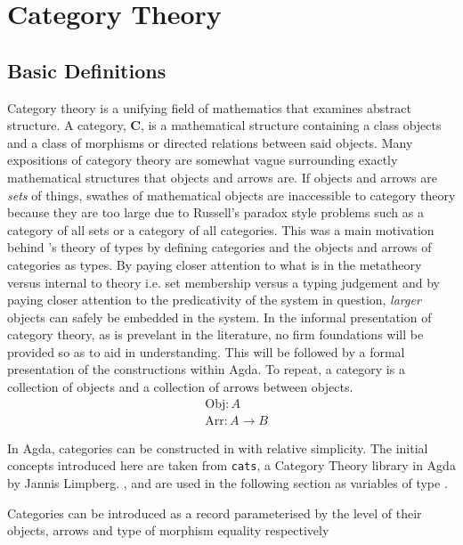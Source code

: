 \section{Category Theory}

\subsection{Basic Definitions}
Category theory is a unifying field of mathematics that examines abstract
structure. A category, \textbf{C}, is a mathematical structure containing a
class objects and a class of morphisms or directed relations between said
objects. Many expositions of category theory are somewhat vague surrounding
exactly mathematical structures that objects and arrows are. If objects and
arrows are \textit{sets} of things, swathes of mathematical objects are
inaccessible to category theory because they are too large due to Russell's
paradox style problems such as a category of all sets or a category of all
categories. This was a main motivation behind \mlt's theory of types by
defining categories and the objects and arrows of categories as types. By paying
closer attention to what is in the metatheory versus internal to theory i.e. set
membership versus a typing judgement and by paying closer attention to the
predicativity of the system in question, \textit{larger} objects can safely be
embedded in the system. In the informal presentation of
category theory, as is prevelant in the literature, no firm foundations will be
provided so as to aid in understanding. This will be followed by a formal
presentation of the constructions within Agda. To repeat, a category is a
collection of objects and a collection of arrows between objects.
\begin{align*}
    &\textrm{Obj} : A \\
    &\textrm{Arr} : A \rightarrow B
\end{align*}

In Agda, categories can be constructed in with relative simplicity. The initial
concepts introduced here are taken from \verb|cats|, a Category Theory library
in Agda by Jannis Limpberg. ,  and 
are used in the following section as variables of type .

Categories can be introduced as a record parameterised by the level of their
objects, arrows and type of morphism equality respectively


